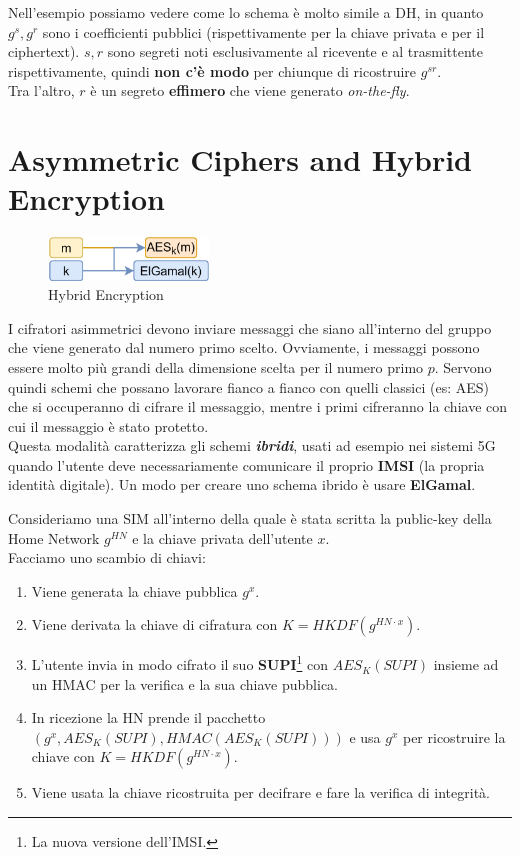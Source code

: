 \begin{note}
Nell'esempio possiamo vedere come lo schema è molto simile a DH, in quanto $g^s,g^r$ sono i coefficienti pubblici (rispettivamente per la chiave privata e per il ciphertext). $s,r$ sono segreti noti esclusivamente al ricevente e al trasmittente rispettivamente, quindi \textbf{non c'è modo} per chiunque di ricostruire $g^{sr}$.\\
Tra l'altro, $r$ è un segreto \textbf{effimero} che viene generato \textit{on-the-fly}.
\end{note}
\section{Asymmetric Ciphers and Hybrid Encryption}
\begin{figure}
\centering
    \includegraphics[width=0.38\textwidth]{image/threshold/hybrid.png}
\caption{Hybrid Encryption}
\label{fig:hybrid}
\end{figure}
I cifratori asimmetrici devono inviare messaggi che siano all'interno del gruppo che viene generato dal numero primo scelto. Ovviamente, i messaggi possono essere molto più grandi della dimensione scelta per il numero primo $p$. Servono quindi schemi che possano lavorare fianco a fianco con quelli classici (es: AES) che si occuperanno di cifrare il messaggio, mentre i primi cifreranno la chiave con cui il messaggio è stato protetto.\\
Questa modalità caratterizza gli schemi \textbf{\textit{ibridi}}, usati ad esempio nei sistemi 5G quando l'utente deve necessariamente comunicare il proprio \textbf{IMSI} (la propria identità digitale). Un modo per creare uno schema ibrido è usare \textbf{ElGamal}.

\begin{example}
Consideriamo una SIM all'interno della quale è stata scritta la public-key della Home Network $g^{HN}$ e la chiave privata dell'utente $x$.\\
Facciamo uno scambio di chiavi:
\begin{enumerate}
    \item Viene generata la chiave pubblica $g^x$.
    \item Viene derivata la chiave di cifratura con $K=HKDF(g^{HN\cdot x})$.
    \item L'utente invia in modo cifrato il suo \textbf{SUPI}\footnote{La nuova versione dell'IMSI.} con $AES_K(SUPI)$ insieme ad un HMAC per la verifica e la sua chiave pubblica.
    \item In ricezione la HN prende il pacchetto $(g^x,AES_K(SUPI),HMAC(AES_K(SUPI)))$ e usa $g^x$ per ricostruire la chiave con $K=HKDF(g^{HN\cdot x})$.
    \item Viene usata la chiave ricostruita per decifrare e fare la verifica di integrità.
\end{enumerate}
\end{example}

